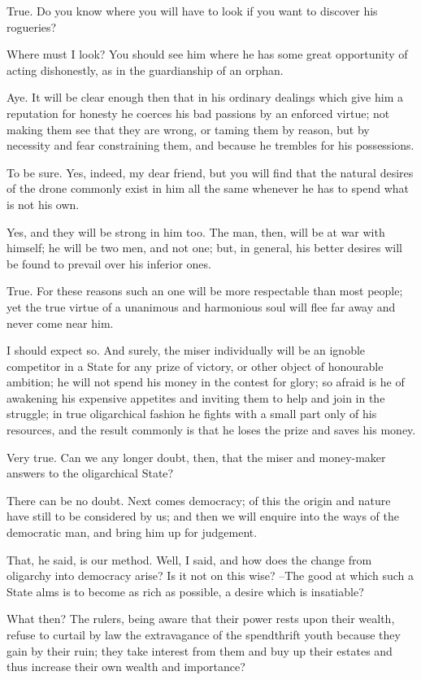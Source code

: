 True.
Do you know where you will have to look if you want to discover his rogueries?

Where must I look?
You should see him where he has some great opportunity of acting dishonestly, as in the guardianship of an orphan.

Aye.
It will be clear enough then that in his ordinary dealings which give him a reputation for honesty he coerces his bad passions by an enforced virtue; not making them see that they are wrong, or taming them by reason, but by necessity and fear constraining them, and because he trembles for his possessions.

To be sure.
Yes, indeed, my dear friend, but you will find that the natural desires of the drone commonly exist in him all the same whenever he has to spend what is not his own.

Yes, and they will be strong in him too.
The man, then, will be at war with himself; he will be two men, and not one; but, in general, his better desires will be found to prevail over his inferior ones.

True.
For these reasons such an one will be more respectable than most people; yet the true virtue of a unanimous and harmonious soul will flee far away and never come near him.

I should expect so.
And surely, the miser individually will be an ignoble competitor in a State for any prize of victory, or other object of honourable ambition; he will not spend his money in the contest for glory; so afraid is he of awakening his expensive appetites and inviting them to help and join in the struggle; in true oligarchical fashion he fights with a small part only of his resources, and the result commonly is that he loses the prize and saves his money.

Very true.
Can we any longer doubt, then, that the miser and money-maker answers to the oligarchical State?

There can be no doubt.
Next comes democracy; of this the origin and nature have still to be considered by us; and then we will enquire into the ways of the democratic man, and bring him up for judgement.

That, he said, is our method.
Well, I said, and how does the change from oligarchy into democracy arise? Is it not on this wise? --The good at which such a State alms is to become as rich as possible, a desire which is insatiable?

What then?
The rulers, being aware that their power rests upon their wealth, refuse to curtail by law the extravagance of the spendthrift youth because they gain by their ruin; they take interest from them and buy up their estates and thus increase their own wealth and importance?

